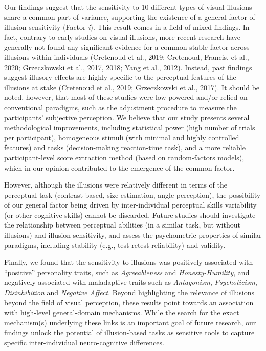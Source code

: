 \documentclass[
  man,floatsintext]{apa6}
\begin{document}
Our findings suggest that the sensitivity to 10 different types of visual illusions share a common part of variance, supporting the existence of a general factor of illusion sensitivity (Factor \emph{i}). This result comes in a field of mixed findings. In fact, contrary to early studies on visual illusions, more recent research have generally not found any significant evidence for a common stable factor across illusions within individuals (Cretenoud et al., 2019; Cretenoud, Francis, et al., 2020; Grzeczkowski et al., 2017, 2018; Yang et al., 2012). Instead, past findings suggest illusory effects are highly specific to the perceptual features of the illusions at stake (Cretenoud et al., 2019; Grzeczkowski et al., 2017). It should be noted, however, that most of these studies were low-powered and/or relied on conventional paradigms, such as the adjustment procedure to measure the participants' subjective perception. We believe that our study presents several methodological improvements, including statistical power (high number of trials per participant), homogeneous stimuli (with minimal and highly controlled features) and tasks (decision-making reaction-time task), and a more reliable participant-level score extraction method (based on random-factors models), which in our opinion contributed to the emergence of the common factor.

However, although the illusions were relatively different in terms of the perceptual task (contrast-based, size-estimation, angle-perception), the possibility of our general factor being driven by inter-individual perceptual skills variability (or other cognitive skills) cannot be discarded. Future studies should investigate the relationship between perceptual abilities (in a similar task, but without illusions) and illusion sensitivity, and assess the psychometric properties of similar paradigms, including stability (e.g., test-retest reliability) and validity.

Finally, we found that the sensitivity to illusions was positively associated with ``positive'' personality traits, such as \emph{Agreeableness} and \emph{Honesty-Humility}, and negatively associated with maladaptive traits such as \emph{Antagonism}, \emph{Psychoticism}, \emph{Disinhibition} and \emph{Negative Affect}. Beyond highlighting the relevance of illusions beyond the field of visual perception, these results point towards an association with high-level general-domain mechanisms. While the search for the exact mechanism(s) underlying these links is an important goal of future research, our findings unlock the potential of illusion-based tasks as sensitive tools to capture specific inter-individual neuro-cognitive differences.
\end{document}
